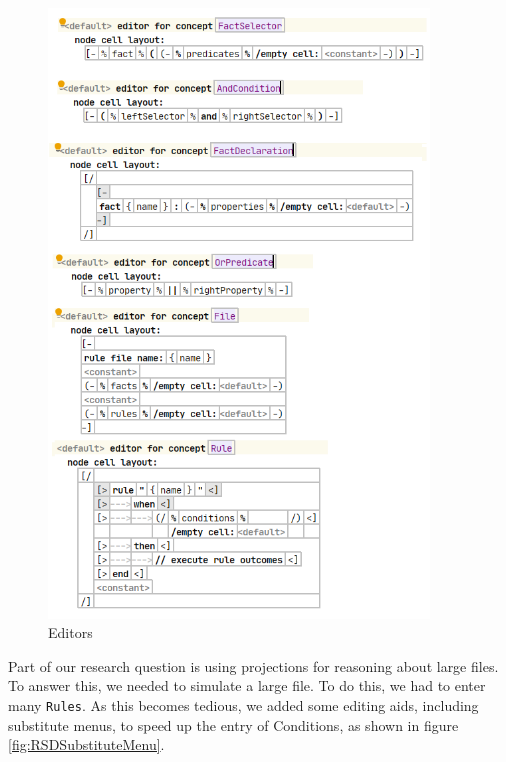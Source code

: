 \begin{figure}
    \centering
    \includegraphics[width=0.9\textwidth]{Sections/images/RSREditors.png} 
    \caption{Editors}
    \label{fig:RSDEditors}
\end{figure}

Part of our research question is using projections for reasoning about large files.
To answer this, we needed to simulate a large file.
To do this, we had to enter many \texttt{Rules}.
As this becomes tedious, we added some editing aids, including substitute menus, to speed up the entry of Conditions, as shown in figure \ref{fig:RSDSubstituteMenu}.

